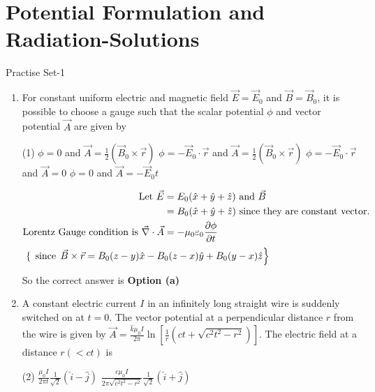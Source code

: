 \chapter{Potential Formulation and Radiation-Solutions}
\begin{abox}
	Practise Set-1
\end{abox}
\begin{enumerate}
	\item   For constant uniform electric and magnetic field $\vec{E}=\vec{E}_{0}$ and $\vec{B}=\vec{B}_{0}$, it is possible to choose a gauge such that the scalar potential $\phi$ and vector potential $\vec{A}$ are given by
	{}
	\begin{tasks}(1)
		\task[\textbf{a.}] $\phi=0$ and $\vec{A}=\frac{1}{2}\left(\vec{B}_{0} \times \vec{r}\right)$
		\task[\textbf{b.}] $\phi=-\vec{E}_{0} \cdot \vec{r}$ and $\vec{A}=\frac{1}{2}\left(\vec{B}_{0} \times \vec{r}\right)$
		\task[\textbf{c.}]  $\phi=-\vec{E}_{0} \cdot \vec{r}$ and $\vec{A}=0$
		\task[\textbf{d.}] $\phi=0$ and $\vec{A}=-\vec{E}_{0} t$
	\end{tasks}
	\begin{answer}
		\begin{align*}
		\text{Let }\vec{E}&=E_{0}(\hat{x}+\hat{y}+\hat{z})\text{ and } \vec{B}\\&=B_{0}(\hat{x}+\hat{y}+\hat{z})\text{ since they are constant vector.}\\
		\text{Lorentz Gauge condition is }\vec{\nabla} \cdot \vec{A}&=-\mu_{0} \varepsilon_{0} \frac{\partial \phi}{\partial t}\\
		\intertext{	$\left\{\right.$ since $\left.\vec{B} \times \vec{r}=B_{0}(z-y) \hat{x}-B_{0}(z-x) \hat{y}+B_{0}(y-x) \hat{z}\right\}$}
		\end{align*}
		So the correct answer is \textbf{Option (a)}
	\end{answer}
	\item	 A constant electric current $I$ in an infinitely long straight wire is suddenly switched on at $t=0$. The vector potential at a perpendicular distance $r$ from the wire is given by $\vec{A}=\frac{\hat{k} \mu_{0} I}{2 \pi} \ln \left[\frac{1}{r}\left(c t+\sqrt{c^{2} t^{2}-r^{2}}\right)\right]$. The electric field at a distance $r(<c t)$ is
	{}
	\begin{tasks}(2)
		\task[\textbf{b.}] $\frac{\mu_{0} I}{2 \pi t} \frac{1}{\sqrt{2}}(\hat{i}-\hat{j})$
		\task[\textbf{c.}] $\frac{c \mu_{0} I}{2 \pi \sqrt{c^{2} t^{2}-r^{2}}} \frac{1}{\sqrt{2}}(\hat{i}+\hat{j})$

\end{tasks}
\end{enumerate}
